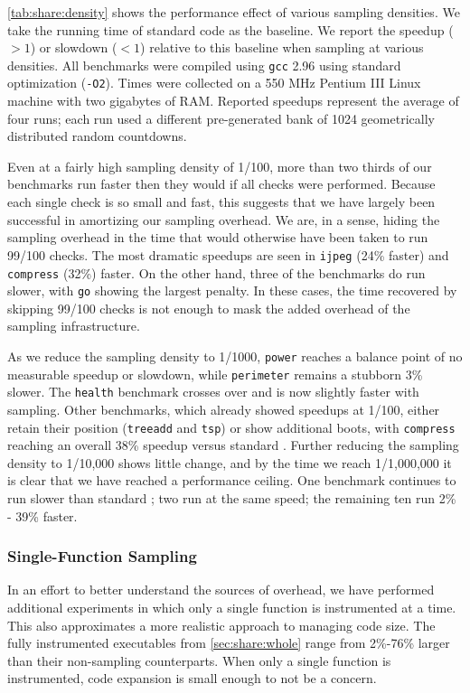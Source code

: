 \autoref{tab:share:density} shows the performance effect of various
sampling densities.  We take the running time of standard \CCured code
as the baseline.  We report the speedup ($>1$) or slowdown ($<1$)
relative to this baseline when sampling at various densities.  All
benchmarks were compiled using \texttt{gcc} 2.96 using standard
optimization (\texttt{-O2}).  Times were collected on a 550 MHz
Pentium III Linux machine with two gigabytes of RAM.  Reported
speedups represent the average of four runs; each run used a different
pre-generated bank of 1024 geometrically distributed random
countdowns.

Even at a fairly high sampling density of 1/100, more than two thirds
of our benchmarks run faster then they would if all checks were
performed.  Because each single check is so small and fast, this
suggests that we have largely been successful in amortizing our
sampling overhead.  We are, in a sense, hiding the sampling overhead
in the time that would otherwise have been taken to run 99/100 checks.
The most dramatic speedups are seen in \texttt{ijpeg} (24\% faster)
and \texttt{compress} (32\%) faster.  On the other hand, three of the
benchmarks do run slower, with \texttt{go} showing the largest
penalty.  In these cases, the time recovered by skipping 99/100 checks
is not enough to mask the added overhead of the sampling
infrastructure.

As we reduce the sampling density to 1/1000, \texttt{power} reaches a
balance point of no measurable speedup or slowdown, while
\texttt{perimeter} remains a stubborn 3\% slower.  The \texttt{health}
benchmark crosses over and is now slightly faster with sampling.
Other benchmarks, which already showed speedups at 1/100, either
retain their position (\texttt{treeadd} and \texttt{tsp}) or show
additional boots, with \texttt{compress} reaching an overall 38\%
speedup versus standard \CCured.  Further reducing the sampling
density to 1/10,000 shows little change, and by the time we reach
1/1,000,000 it is clear that we have reached a performance ceiling.
One benchmark continues to run slower than standard \CCured; two run
at the same speed; the remaining ten run 2\% - 39\% faster.

\subsubsection{Single-Function Sampling}

In an effort to better understand the sources of overhead, we have
performed additional experiments in which only a single function is
instrumented at a time.  This also approximates a more realistic
approach to managing code size.  The fully instrumented executables
from \autoref{sec:share:whole} range from 2\%-76\% larger than their
non-sampling counterparts.  When only a single function is
instrumented, code expansion is small enough to not be a concern.

